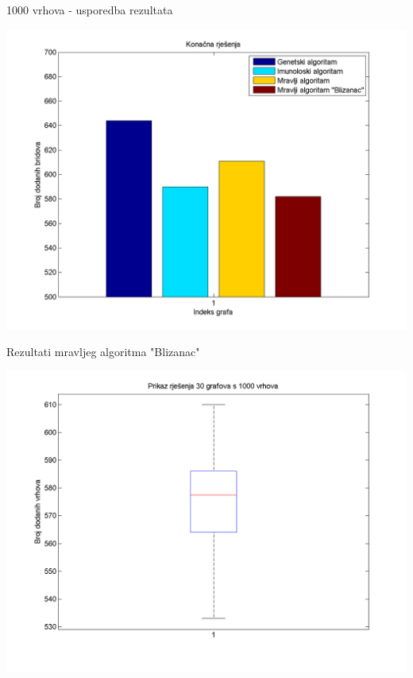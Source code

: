 \documentclass{beamer}
\begin{document}
\begin{frame}{1000 vrhova - usporedba rezultata}
\begin{center}
\includegraphics[scale = 0.45]{Zajedno1000.png}\\
\end{center}
\end{frame}

\begin{frame}{Rezultati mravljeg algoritma "Blizanac"}
\begin{center}
\includegraphics[scale = 0.45]{boxplot.png}\\
\end{center}
\end{frame}
\end{document}
